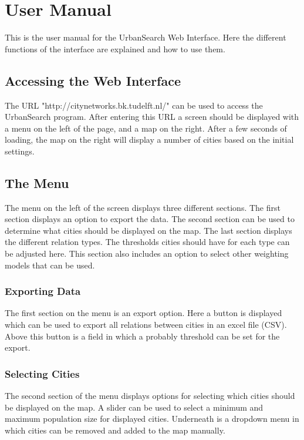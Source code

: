 \chapter{User Manual}
This is the user manual for the UrbanSearch Web Interface. Here the different functions of the interface are explained and how to use them. 

\section{Accessing the Web Interface}
The URL "http://citynetworks.bk.tudelft.nl/" can be used to access the UrbanSearch program. After entering this URL a screen should be displayed with a menu on the left of the page, and a map on the right. After a few seconds of loading, the map on the right will display a number of cities based on the initial settings. 


\section{The Menu}
The menu on the left of the screen displays three different sections. The first section displays an option to export the data. The second section can be used to determine what cities should be displayed on the map. The last section displays the different relation types. The thresholds cities should have for each type can be adjusted here. This section also includes an option to select other weighting models that can be used.


\subsection{Exporting Data}
The first section on the menu is an export option. Here a button is displayed which can be used to export all relations between cities in an excel file (CSV). Above this button is a field in which a probably threshold can be set for the export. 


\subsection{Selecting Cities}
The second section of the menu displays options for selecting which cities should be displayed on the map. A slider can be used to select a minimum and maximum population size for displayed cities. Underneath is a dropdown menu in which cities can be removed and added to the map manually. 


